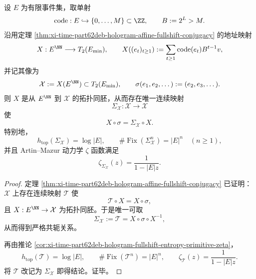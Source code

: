 \begin{theorem}[全息事件像与单侧满移位的严格共轭]\label{thm:conclusion-hologram-fullshift-topological-conjugacy}
设 \(E\) 为有限事件集，取单射
\[
\mathrm{code}:E\hookrightarrow \{0,\dots,M\}\subset \ZZ,
\qquad
B:=2^L>M.
\]
沿用定理 \ref{thm:xi-time-part62deb-hologram-affine-fullshift-conjugacy} 的地址映射
\[
X:E^{\NN}\longrightarrow T_2(E_{\min}),
\qquad
X((e_t)_{t\ge 1})
:=
\sum_{t\ge 1}\mathrm{code}(e_t)B^{t-1}v,
\]
并记其像为
\[
\mathcal X:=X(E^{\NN})\subset T_2(E_{\min}),
\qquad
\sigma(e_1,e_2,\dots):=(e_2,e_3,\dots).
\]
则 \(X\) 是从 \(E^{\NN}\) 到 \(\mathcal X\) 的拓扑同胚，从而存在唯一连续映射
\[
\Sigma_{\mathcal X}:\mathcal X\to \mathcal X
\]
使
\[
\boxed{\;
X\circ \sigma=\Sigma_{\mathcal X}\circ X.\;}
\]
特别地，
\[
\boxed{\;
h_{\mathrm{top}}(\Sigma_{\mathcal X})=\log|E|,\qquad
\#\operatorname{Fix}(\Sigma_{\mathcal X}^n)=|E|^n\quad(n\ge 1),\;}
\]
并且 Artin--Mazur 动力学 \(\zeta\) 函数满足
\[
\boxed{\;
\zeta_{\Sigma_{\mathcal X}}(z)=\frac{1}{1-|E|z}.\;}
\]
\end{theorem}
\begin{proof}
定理 \ref{thm:xi-time-part62deb-hologram-affine-fullshift-conjugacy} 已证明：\(\mathcal X\) 上存在连续映射 \(\mathcal T\) 使
\[
\mathcal T\circ X=X\circ \sigma,
\]
且 \(X:E^{\NN}\to \mathcal X\) 为拓扑同胚。于是唯一可取
\[
\Sigma_{\mathcal X}:=\mathcal T=X\circ \sigma\circ X^{-1},
\]
从而得到严格共轭关系。

再由推论 \ref{cor:xi-time-part62deb-hologram-fullshift-entropy-primitive-zeta}，
\[
h_{\mathrm{top}}(\mathcal T)=\log|E|,
\qquad
\#\operatorname{Fix}(\mathcal T^n)=|E|^n,
\qquad
\zeta_{\mathcal T}(z)=\frac{1}{1-|E|z}.
\]
将 \(\mathcal T\) 改记为 \(\Sigma_{\mathcal X}\) 即得结论。证毕。
\end{proof}

